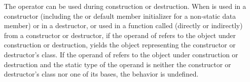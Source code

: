 \pnum
{}%
%
%
%
The
operator can be used during construction or destruction.
When
is used in a constructor (including the
 or default member initializer
for a non-static data member)
or in a destructor, or used in a function called (directly or indirectly) from
a constructor or destructor, if the operand of
refers to the object under construction or destruction,
yields the
object representing the constructor or destructor's class.
If the operand of
refers to the object under construction or destruction and the static type of
the operand is neither the constructor or destructor's class nor one of its
bases, the behavior is undefined.
%
%
%
%
%

